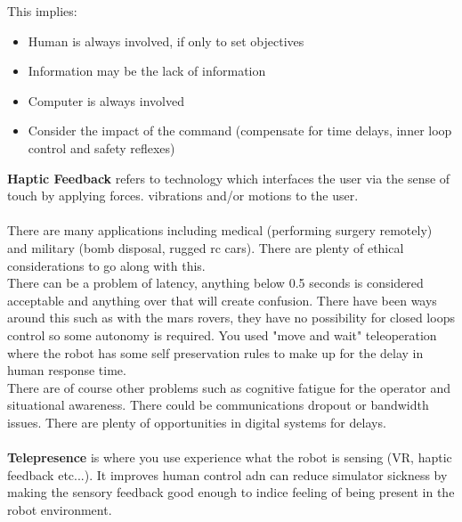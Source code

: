 \documentclass{article}
\begin{document}
	This implies:
	\begin{itemize}
		\item Human is always involved, if only to set objectives
		\item Information may be the lack of information
		\item Computer is always involved
		\item Consider the impact of the command (compensate for time delays, inner loop control and safety reflexes)
	\end{itemize}
	{\bfseries Haptic Feedback} refers to technology which interfaces the user via the sense of touch by applying forces. vibrations and/or motions to the user.
	\\ \\
	There are many applications including medical (performing surgery remotely) and military (bomb disposal, rugged rc cars). There are plenty of ethical considerations to go along with this.\\
	There can be a problem of latency, anything below 0.5 seconds is considered acceptable and anything over that will create confusion. There have been ways around this such as with the mars rovers, they have no possibility for closed loops control so some autonomy is required. You used "move and wait" teleoperation where the robot has some self preservation rules to make up for the delay in human response time.\\
	There are of course other problems such as cognitive fatigue for the operator and situational awareness. There could be communications dropout or bandwidth issues. There are plenty of opportunities in digital systems for delays.\\ \\
	{\bfseries Telepresence} is where you use experience what the robot is sensing (VR, haptic feedback etc...). It improves human control adn can reduce simulator sickness by making the sensory feedback good enough to indice feeling of being present in the robot environment.
\end{document}
